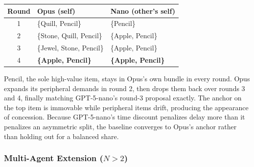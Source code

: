 \begin{center}
\begin{tabular}{cll}
\toprule
Round & Opus (self) & Nano (other's self) \\
\midrule
1 & \{Quill, Pencil\} & \{Pencil\} \\
2 & \{Stone, Quill, Pencil\} & \{Apple, Pencil\} \\
3 & \{Jewel, Stone, Pencil\} & \{Apple, Pencil\} \\
4 & \textbf{\{Apple, Pencil\}} & \textbf{\{Apple, Pencil\}} \\
\bottomrule
\end{tabular}
\end{center}

Pencil, the sole high-value item, stays in Opus's own bundle in every round. Opus expands its peripheral demands in round 2, then drops them back over rounds 3 and 4, finally matching GPT-5-nano's round-3 proposal exactly. The anchor on the top item is immovable while peripheral items drift, producing the appearance of concession. Because GPT-5-nano's time discount penalizes delay more than it penalizes an asymmetric split, the baseline converges to Opus's anchor rather than holding out for a balanced share.

\subsubsection{Multi-Agent Extension ($N > 2$)}
\label{sec:game1_n3}

